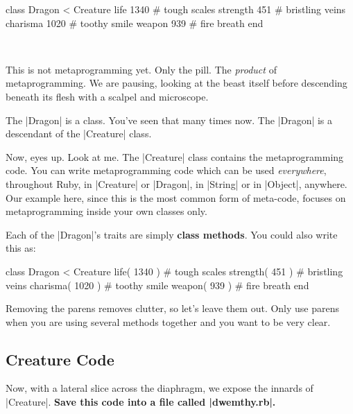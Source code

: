 \documentclass[12pt,twoside]{report}
\begin{document}
\begin{rubycode}

 class Dragon < Creature
   life 1340     # tough scales
   strength 451  # bristling veins
   charisma 1020 # toothy smile
   weapon 939    # fire breath
 end

\end{rubycode}

\ %

\pagebreak

This is not metaprogramming yet.  Only the pill.  The {\em product} of
metaprogramming.  We are pausing, looking at the beast itself before
descending beneath its flesh with a scalpel and microscope.

The \rubyinline|Dragon| is a class.  You've seen that
many times now.  The \rubyinline|Dragon| is a
descendant of the \rubyinline|Creature| class.

Now, eyes up.  Look at me.  The \rubyinline|Creature|
class contains the metaprogramming code.  You can write
metaprogramming code which can be used {\em everywhere}, throughout
Ruby, in \rubyinline|Creature| or
\rubyinline|Dragon|, in
\rubyinline|String| or in
\rubyinline|Object|, anywhere. Our example here, since
this is the most common form of meta-code, focuses on metaprogramming
inside your own classes only.

Each of the \rubyinline|Dragon|'s traits are simply
{\bf class methods}.  You could also write this as:


\begin{rubycode}

 class Dragon < Creature
   life( 1340 )     # tough scales
   strength( 451 )  # bristling veins
   charisma( 1020 ) # toothy smile
   weapon( 939 )    # fire breath
 end

\end{rubycode}


Removing the parens removes clutter, so let's leave them out.  Only
use parens when you are using several methods together and you want to
be very clear.



\subsection{Creature Code}



Now, with a lateral slice across the diaphragm, we expose the innards
of \rubyinline|Creature|.  {\bf Save this code into a
  file called \rubyinline|dwemthy.rb|.}
\end{document}
